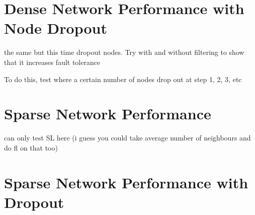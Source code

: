 \section{Dense Network Performance with Node Dropout}

the same but this time dropout nodes. Try with and without filtering to show that it increases fault tolerance

To do this, test where a certain number of nodes drop out at step 1, 2, 3, etc

\section{Sparse Network Performance}

can only test SL here (i guess you could take average number of neighbours and do fl on that too)

\section{Sparse Network Performance with Dropout}